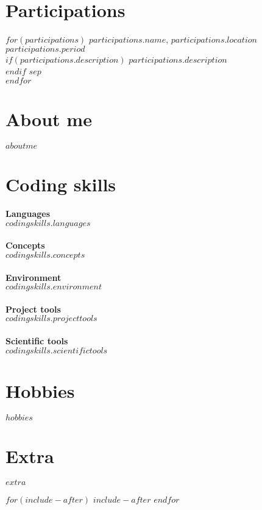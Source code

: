 \documentclass[
$if(fontsize)$
    $fontsize$,
$endif$
$if(lang)$
    $babel-lang$,
$endif$
$if(papersize)$
    $papersize$paper,
$endif$
$for(classoption)$
    $classoption$$sep$,
$endfor$
]{$documentclass$}
\begin{document}
\section{Participations}
\footnotesize
\begin{adjustwidth}{3cm}{0cm}
    $for(participations)$
    \textbf{$participations.name$}, $participations.location$\hfill \textit{$participations.period$}\\
        $if(participations.description)$
            $participations.description$\\
        $endif$
        $sep$\\
    $endfor$
\end{adjustwidth}

\section{About me}
\footnotesize
\begin{adjustwidth}{3cm}{0cm}
    $aboutme$
\end{adjustwidth}

\section{Coding skills}
\footnotesize
\begin{adjustwidth}{3cm}{0cm}
    \textbf{Languages}\\
    $codingskills.languages$\\\\
    \textbf{Concepts}\\
    $codingskills.concepts$\\\\
    \textbf{Environment}\\
    $codingskills.environment$\\\\
    \textbf{Project tools}\\
    $codingskills.projecttools$\\\\
    \textbf{Scientific tools}\\
    $codingskills.scientifictools$
\end{adjustwidth}

\section{Hobbies}
\footnotesize
\begin{adjustwidth}{3cm}{0cm}
    $hobbies$
\end{adjustwidth}

\section{Extra}
\footnotesize
\begin{adjustwidth}{3cm}{0cm}
    $extra$
\end{adjustwidth}

$for(include-after)$
    $include-after$
$endfor$

\end{document}
